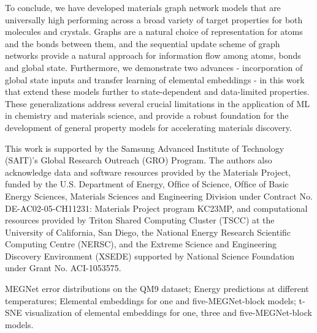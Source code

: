 \documentclass[manuscript=article]{achemso}
\begin{document}
To conclude, we have developed materials graph network models that are universally high performing across a broad variety of target properties for both  molecules and crystals. Graphs are a natural choice of representation for atoms and the bonds between them, and the sequential update scheme of graph networks provide a natural approach for information flow among atoms, bonds and global state. Furthermore, we demonstrate two advances - incorporation of global state inputs and transfer learning of elemental embeddings - in this work that extend these models further to state-dependent and data-limited properties. These generalizations address several crucial limitations in the application of ML in chemistry and materials science, and provide a robust foundation for the development of general property models for accelerating materials discovery.  

\begin{acknowledgement}
This work is supported by the Samsung Advanced Institute of Technology (SAIT)'s Global Research Outreach (GRO) Program. The authors also acknowledge data and software resources provided by the Materials Project, funded by the U.S. Department of Energy, Ofﬁce of Science, Ofﬁce of Basic Energy Sciences, Materials Sciences and Engineering Division under Contract No. DE-AC02-05-CH11231: Materials Project program KC23MP, and computational resources provided by Triton Shared Computing Cluster (TSCC) at the University of California, San Diego, the National Energy Research Scientiﬁc Computing Centre (NERSC), and the Extreme Science and Engineering Discovery Environment (XSEDE) supported by National Science Foundation under Grant No. ACI-1053575.
\end{acknowledgement}

\begin{suppinfo}
MEGNet error distributions on the QM9 dataset;  Energy predictions at different temperatures; 
Elemental embeddings for one and five-MEGNet-block models; t-SNE visualization of elemental embeddings for one, three and five-MEGNet-block models.
\end{suppinfo}


\end{document}
